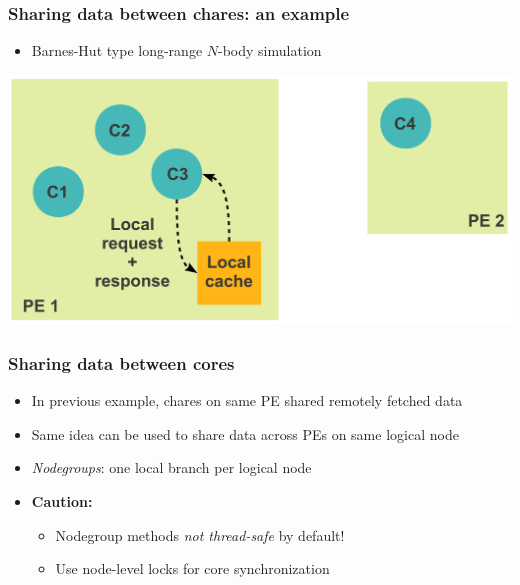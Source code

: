 \begin{frame}[fragile]
  \frametitle{Sharing data between chares: an example}
  \begin{itemize}
    \item Barnes-Hut type long-range $N$-body simulation
  \end{itemize}
  \includegraphics[width=\textwidth]{figures/advancedOpts/fig8}
\end{frame}

\begin{frame}[fragile]
  \frametitle{Sharing data between cores}
  \begin{itemize}
    \item In previous example, chares on same PE shared remotely fetched data
    \item Same idea can be used to share data across PEs on same logical node
    \item {\em Nodegroups}: one local branch per logical node
    \item {\bf Caution:}
    \begin{itemize}
      \item Nodegroup methods {\em not thread-safe} by default! 
      \item Use node-level locks for core synchronization
    \end{itemize}
  \end{itemize}
\end{frame}
